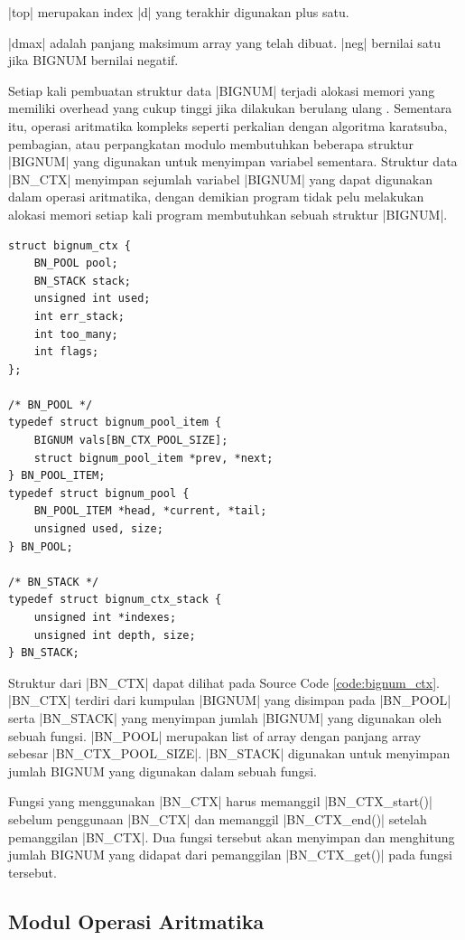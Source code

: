     |top| merupakan index |d| yang terakhir digunakan plus satu.

    |dmax| adalah panjang maksimum array yang telah dibuat. |neg| bernilai satu jika BIGNUM bernilai negatif.

    Setiap kali pembuatan struktur data |BIGNUM| terjadi alokasi memori yang memiliki overhead yang cukup tinggi jika dilakukan berulang ulang \citep{doc_bnctx}. Sementara itu, operasi aritmatika kompleks seperti perkalian dengan algoritma karatsuba, pembagian, atau perpangkatan modulo membutuhkan beberapa struktur |BIGNUM| yang digunakan untuk menyimpan variabel sementara. Struktur data |BN_CTX| menyimpan sejumlah variabel |BIGNUM| yang dapat digunakan dalam operasi aritmatika, dengan demikian program tidak pelu melakukan alokasi memori setiap kali program membutuhkan sebuah struktur |BIGNUM|.


    \begin{lstlisting}[caption={Struktur bignum\_ctx}, label={code:bignum_ctx}]
struct bignum_ctx {
    BN_POOL pool;
    BN_STACK stack;
    unsigned int used;
    int err_stack;
    int too_many;
    int flags;
};

/* BN_POOL */
typedef struct bignum_pool_item {
    BIGNUM vals[BN_CTX_POOL_SIZE];
    struct bignum_pool_item *prev, *next;
} BN_POOL_ITEM;
typedef struct bignum_pool {
    BN_POOL_ITEM *head, *current, *tail;
    unsigned used, size;
} BN_POOL;

/* BN_STACK */
typedef struct bignum_ctx_stack {
    unsigned int *indexes;
    unsigned int depth, size;
} BN_STACK;
    \end{lstlisting}

    Struktur dari |BN_CTX| dapat dilihat pada Source Code \ref{code:bignum_ctx}. |BN_CTX| terdiri dari kumpulan |BIGNUM| yang disimpan pada |BN_POOL| serta |BN_STACK| yang menyimpan jumlah |BIGNUM| yang digunakan oleh sebuah fungsi. |BN_POOL| merupakan list of array dengan panjang array sebesar |BN_CTX_POOL_SIZE|. |BN_STACK| digunakan untuk menyimpan jumlah BIGNUM yang digunakan dalam sebuah fungsi.

    Fungsi yang menggunakan |BN_CTX| harus memanggil |BN_CTX_start()| sebelum penggunaan |BN_CTX| dan memanggil |BN_CTX_end()| setelah pemanggilan |BN_CTX|. Dua fungsi tersebut akan menyimpan dan menghitung jumlah BIGNUM yang didapat dari pemanggilan |BN_CTX_get()| pada fungsi tersebut.

  \subsection{Modul Operasi Aritmatika}

